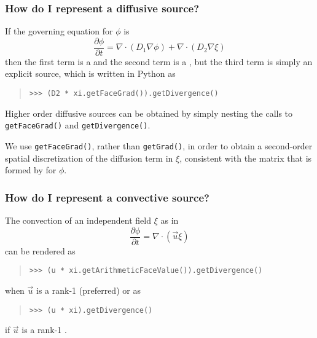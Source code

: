                 \subsubsection{How do I represent a diffusive source?}
                    If the governing equation for $\phi$ is
                    \[
                        \frac{\partial \phi}{\partial t} 
                        = \nabla\cdot\left( D_1 \nabla \phi\right)
                        + \nabla\cdot\left( D_2 \nabla \xi\right)
                    \]
                    then the first term is a  and the second term 
                    is a , but the third term is 
                    simply an explicit source, which is written in Python as
                    \begin{quote}
\begin{verbatim}
>>> (D2 * xi.getFaceGrad()).getDivergence()
\end{verbatim}
                    \end{quote}
                    Higher order diffusive sources can be obtained by
                    simply nesting the calls to \verb+getFaceGrad()+
                    and \verb+getDivergence()+.
                    \begin{reSTadmonition}[Note]
                        We use \verb|getFaceGrad()|, rather than
                        \verb|getGrad()|, in order to obtain a
                        second-order spatial discretization of the
                        diffusion term in $\xi$, consistent with the
                        matrix that is formed by
                         for $\phi$.
                    \end{reSTadmonition}

                \subsubsection{How do I represent a convective source?}
                    The convection of an independent field $\xi$ as in
                    \[
                        \frac{\partial \phi}{\partial t} 
                        = \nabla\cdot
                        \left(
                            \vec{u} \xi
                        \right)
                    \]
                    can be rendered as
                    \begin{quote}
\begin{verbatim}
>>> (u * xi.getArithmeticFaceValue()).getDivergence()
\end{verbatim}
                    \end{quote}
                    when $\vec{u}$ is a rank-1  
                    (preferred) or as
                    \begin{quote}
\begin{verbatim}
>>> (u * xi).getDivergence()
\end{verbatim}
                    \end{quote}
                    if $\vec{u}$ is a rank-1 .


